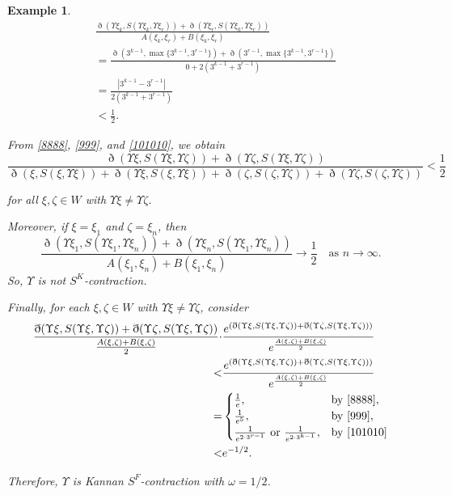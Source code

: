 \documentclass[pdflatex,sn-mathphys-num]{sn-jnl}%
\theoremstyle{thmstyleone}%
\theoremstyle{thmstyletwo}%
\newtheorem{example}{Example}%
\theoremstyle{thmstylethree}%
\begin{document}
\begin{example}
\begin{equation}\label{101010}
    \begin{split}
        &\frac{\eth(\Upsilon \xi_k,S(\Upsilon \xi_k,\Upsilon \xi_r))+\eth(\Upsilon \xi_r,S(\Upsilon \xi_k,\Upsilon \xi _r))}
     {A(\xi_k,\xi_r)+B(\xi_k,\xi_r)}\\
&= \frac{\eth(3^{k-1},\max\{3^{k-1},3^{r-1} \})+\eth(3^{r-1},\max\{3^{k-1},3^{r-1} \})}{0+2(3^{k-1}+3^{r-1})}\\
&=
\frac{|3^{k-1}-3^{r-1}|}
     {2(3^{k-1}+3^{r-1})}\\
&<\frac12.
    \end{split}
\end{equation}


From \eqref{8888}, \eqref{999}, and \eqref{101010}, we obtain
\[\frac{\eth(\Upsilon \xi,S(\Upsilon \xi,\Upsilon \zeta))+\eth(\Upsilon \zeta,S(\Upsilon \xi,\Upsilon \zeta))}{\eth(\xi,S(\xi,\Upsilon \xi ))+\eth(\Upsilon \xi,S(\xi,\Upsilon \xi ))+\eth(\zeta ,S(\zeta,\Upsilon \zeta))+\eth(\Upsilon \zeta,S(\zeta,\Upsilon \zeta))} < \frac12\]

for all $\xi,\zeta \in W$ with $\Upsilon \xi\ne \Upsilon \zeta$.

Moreover, if $\xi =\xi_1$ and $\zeta =\xi_n$, then
\[
\frac{\eth(\Upsilon \xi_1,S(\Upsilon \xi_1,\Upsilon \xi _n))+\eth(\Upsilon \xi_n,S(\Upsilon \xi_1,\Upsilon \xi_n))}
     {A(\xi_1,\xi_n)+B(\xi_1,\xi_n)}
\to \frac12
\quad \text{as } n\to\infty.
\]
So, $\Upsilon $ is not \textit{$S^K$-contraction}.

\medskip
Finally, for each $\xi,\zeta \in W$ with $\Upsilon \xi\ne \Upsilon \zeta$, consider
\begin{align*}
\frac{\eth(\Upsilon \xi,S(\Upsilon \xi,\Upsilon \zeta))+\eth(\Upsilon \zeta,S(\Upsilon \xi,\Upsilon \zeta))}{\frac{A(\xi ,\zeta)+B(\xi ,\zeta)}{2}}
\cdot&\frac{e^{\left(
\eth(\Upsilon \xi,S(\Upsilon \xi,\Upsilon \zeta))+\eth(\Upsilon \zeta,S(\Upsilon \xi,\Upsilon \zeta))
\right)}}{e^{\frac{A(\xi ,\zeta)+B(\xi ,\zeta)}{2}}}\\
<&\frac{e^{\left(
\eth(\Upsilon \xi,S(\Upsilon \xi,\Upsilon \zeta))+\eth(\Upsilon \zeta,S(\Upsilon \xi,\Upsilon \zeta))
\right)}}{e^{\frac{A(\xi ,\zeta)+B(\xi ,\zeta)}{2}}}\\
=&\begin{cases}
\frac{1}{e}, & \text{by \eqref{8888}},\\
\frac{1}{e^5}, & \text{by \eqref{999}},\\
\frac{1}{e^{2\cdot 3^{r-1}}} \ \text{or}\ \frac{1}{e^{2\cdot 3^{k-1}}}, & \text{by \eqref{101010}}
\end{cases}\\
<& e^{-1/2}.
\end{align*}

Therefore, $\Upsilon $ is \textit{Kannan $S^F$-contraction} with $\omega  =1/2$.
\end{example}
\end{document}
